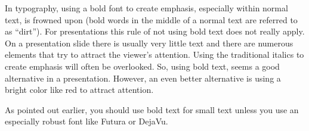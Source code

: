 In typography, using a bold font to create emphasis, especially within normal text, is frowned upon (bold words in the middle of a normal text are referred to as ``dirt''). For presentations this rule of not using bold text does not really apply. On a presentation slide there is usually very little text and there are numerous elements that try to attract the viewer's attention. Using the traditional italics to create emphasis will often be overlooked. So, using bold text, seems a good alternative in a presentation. However, an even better alternative is using a bright color like red to attract attention.

As pointed out earlier, you should use bold text for small text unless you use an especially robust font like Futura or DejaVu.
